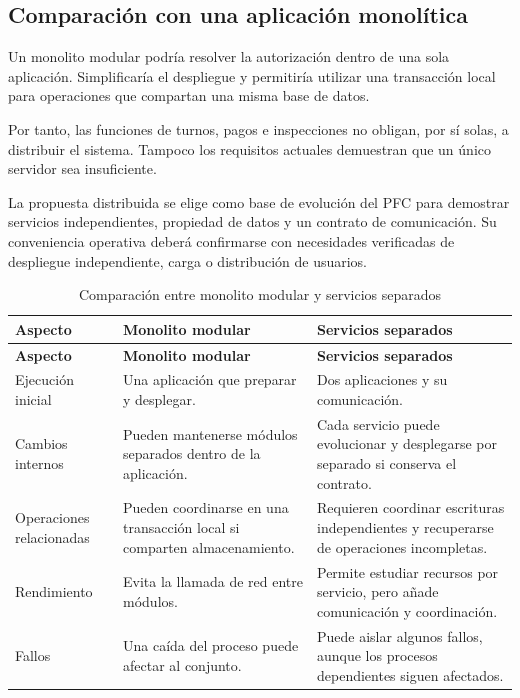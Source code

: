 \documentclass[11pt,a4paper]{article}
\begin{document}
\subsection{Comparación con una aplicación monolítica}

Un monolito modular podría resolver la autorización dentro de una sola aplicación. Simplificaría el despliegue y permitiría utilizar una transacción local para operaciones que compartan una misma base de datos.

Por tanto, las funciones de turnos, pagos e inspecciones no obligan, por sí solas, a distribuir el sistema. Tampoco los requisitos actuales demuestran que un único servidor sea insuficiente.

La propuesta distribuida se elige como base de evolución del PFC para demostrar servicios independientes, propiedad de datos y un contrato de comunicación. Su conveniencia operativa deberá confirmarse con necesidades verificadas de despliegue independiente, carga o distribución de usuarios.

\begin{xltabular}{\textwidth}{L{3.2cm}XX}
  \caption{Comparación entre monolito modular y servicios separados}\label{tab:monolito}\\
  \toprule
  \textbf{Aspecto} & \textbf{Monolito modular} & \textbf{Servicios separados} \\
  \midrule
  \endfirsthead
  \toprule
  \textbf{Aspecto} & \textbf{Monolito modular} & \textbf{Servicios separados} \\
  \midrule
  \endhead
  \bottomrule
  \endfoot
  Ejecución inicial & Una aplicación que preparar y desplegar. & Dos aplicaciones y su comunicación. \\
  Cambios internos & Pueden mantenerse módulos separados dentro de la aplicación. & Cada servicio puede evolucionar y desplegarse por separado si conserva el contrato. \\
  Operaciones relacionadas & Pueden coordinarse en una transacción local si comparten almacenamiento. & Requieren coordinar escrituras independientes y recuperarse de operaciones incompletas. \\
  Rendimiento & Evita la llamada de red entre módulos. & Permite estudiar recursos por servicio, pero añade comunicación y coordinación. \\
  Fallos & Una caída del proceso puede afectar al conjunto. & Puede aislar algunos fallos, aunque los procesos dependientes siguen afectados. \\
\end{xltabular}
\end{document}
